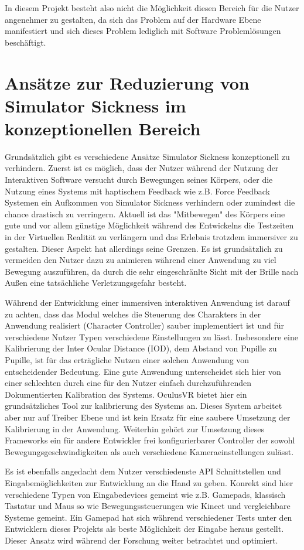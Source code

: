 \documentclass[pagesize, paper=a4, fontsize=12pt,titlepage=true, headings=small, headnosepline, abstractoff, liststotoc, nochapterprefix, plainheadsepline]{scrreprt}
\begin{document}
In diesem Projekt besteht also nicht die Möglichkeit diesen Bereich für die Nutzer angenehmer zu gestalten, da sich das Problem auf der Hardware Ebene manifestiert und sich dieses Problem lediglich mit Software Problemlösungen beschäftigt.

\section{Ansätze zur Reduzierung von Simulator Sickness im konzeptionellen Bereich}
Grundsätzlich gibt es verschiedene Ansätze Simulator Sickness konzeptionell zu verhindern. Zuerst ist es möglich, dass der Nutzer während der Nutzung der Interaktiven Software versucht durch Bewegungen seines Körpers, oder die Nutzung eines Systems mit haptischem Feedback wie z.B. Force Feedback Systemen ein Aufkommen von Simulator Sickness verhindern oder zumindest die chance drastisch zu verringern. Aktuell ist das "Mitbewegen" des Körpers eine gute und vor allem günstige Möglichkeit während des Entwickelns die Testzeiten in der Virtuellen Realität zu verlängern und das Erlebnis trotzdem immersiver zu gestalten. Dieser Aspekt hat allerdings seine Grenzen. Es ist grundsätzlich zu vermeiden den Nutzer dazu zu animieren während einer Anwendung zu viel Bewegung auszuführen, da durch die sehr eingeschränlte Sicht mit der Brille nach Außen eine tatsächliche Verletzungsgefahr besteht.

Während der Entwicklung einer immersiven interaktiven Anwendung ist darauf zu achten, dass das Modul welches die Steuerung des Charakters in der Anwendung realisiert (Character Controller) sauber implementiert ist und für verschiedene Nutzer Typen verschiedene Einstellungen zu lässt. Insbesondere eine Kalibrierung der Inter Ocular Distance (IOD), dem Abstand von Pupille zu Pupille, ist für das erträgliche Nutzen einer solchen Anwendung von entscheidender Bedeutung. Eine gute Anwendung unterscheidet sich hier von einer schlechten durch eine für den Nutzer einfach durchzuführenden Dokumentierten Kalibration des Systems. OculusVR bietet hier ein grundsätzliches Tool zur kalibrierung des Systems an. Dieses System arbeitet aber nur auf Treiber Ebene und ist kein Ersatz für eine saubere Umsetzung der Kalibrierung in der Anwendung.
Weiterhin gehört zur  Umsetzung dieses Frameworks ein für andere Entwickler frei konfigurierbarer Controller der sowohl Bewegungsgeschwindigkeiten als auch verschiedene Kameraeinstellungen zulässt.

Es ist ebenfalls angedacht dem Nutzer verschiedenste API Schnittstellen und Eingabemöglichkeiten zur Entwicklung an die Hand zu geben. Konrekt sind hier verschiedene Typen von Eingabedevices gemeint wie z.B. Gamepads, klassisch Tastatur und Maus so wie Bewegungssteuerungen wie Kinect und vergleichbare Systeme gemeint. Ein Gamepad hat sich während verschiedener Tests unter den Entwicklern dieses Projekts als beste Möglichkeit der Eingabe heraus gestellt. Dieser Ansatz wird während der Forschung weiter betrachtet und optimiert.
\end{document}
